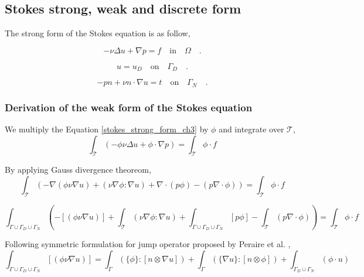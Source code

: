 \documentclass[a4paper,openany]{book}
\begin{document}
\subsection{Stokes strong, weak and discrete form} \label{Stokes_flow_ch3}

The strong form of the Stokes equation is as follow,

\begin{equation} \label{stokes_strong_form_ch3}
-\nu \Delta u + \nabla p = f \quad \textrm{in} \quad \Omega \quad \textrm{.}
\end{equation}

\begin{equation} \label{dirichlet condition stokes_ch3}
u = u_D \quad \textrm{on} \quad \Gamma_D \quad \textrm{.}
\end{equation}

\begin{equation} \label{neumann condition stokes_ch3}
-pn + \nu n \cdot \nabla u = t \quad \textrm{on} \quad \Gamma_N \quad \textrm{.}
\end{equation}


\subsubsection{Derivation of the weak form of the Stokes equation} \label{derivation_weak_stokes}

We multiply the Equation \ref{stokes_strong_form_ch3} by $\phi$ and integrate over $\mathcal{T}$,
\begin{equation}
\int_{\mathcal{T}} (- \phi \nu \Delta u + \phi \cdot \nabla p) = \int_{\mathcal{T}} \phi \cdot f 
\end{equation}

By applying Gauss divergence theoreom,
\begin{equation}
\int_{\mathcal{T}} (-\nabla (\phi \nu \nabla u) + (\nu \nabla \phi : \nabla u) + \nabla \cdot (p \phi) - (p \nabla \cdot \phi)) = \int_{\mathcal{T}} \phi \cdot f 
\end{equation}

\begin{equation}
\int_{\Gamma \cup \Gamma_D \cup \Gamma_N} (- [(\phi \nu \nabla u)] + \int_{\mathcal{T}}  (\nu \nabla \phi : \nabla u) + \int_{\Gamma \cup \Gamma_D \cup \Gamma_N}  [p \phi] - \int_{\mathcal{T}}  (p \nabla \cdot \phi)) = \int_{\mathcal{T}} \phi \cdot f 
\end{equation}

Following symmetric formulation for jump operator proposed by Peraire et al. \cite{peraire},
\begin{equation}
\int_{\Gamma \cup \Gamma_D \cup \Gamma_N} [(\phi \nu \nabla u)] = \int_{\Gamma} (\lbrace \phi \rbrace : [n \otimes \nabla u]) + \int_{\Gamma} (\lbrace \nabla u \rbrace : [n \otimes \phi]) + \int_{\Gamma_D \cup \Gamma_N} (\phi \cdot u ) 
\end{equation}
\end{document}
